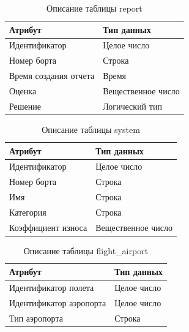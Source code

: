 \begin{table}[H]
    \centering
    \captionsetup{justification=centering}
    \caption{Описание таблицы report}
    \begin{tabular}{|p{}|p{}|}
        \hline
        Атрибут & Тип данных \\
        \hline
        Идентификатор & Целое число \\
        Номер борта & Строка \\
        Время создания отчета & Время \\
        Оценка & Вещественное число \\
        Решение & Логический тип \\
        \hline
    \end{tabular}
    \label{tab:tabl7}
\end{table}

\begin{table}[H]
    \centering
    \captionsetup{justification=centering}
    \caption{Описание таблицы system}
    \begin{tabular}{|p{}|p{}|}
        \hline
        Атрибут & Тип данных \\
        \hline
        Идентификатор & Целое число \\
        Номер борта & Строка \\
        Имя & Строка \\
        Категория & Строка \\
        Коэффициент износа & Вещественное число \\
        \hline
    \end{tabular}
    \label{tab:tabl8}
\end{table}

\begin{table}[H]
    \centering
    \captionsetup{justification=centering}
    \caption{Описание таблицы flight\_airport}
    \begin{tabular}{|p{}|p{}|}
        \hline
        Атрибут & Тип данных \\
        \hline
        Идентификатор полета & Целое число \\
        Идентификатор аэропорта & Целое число \\
        Тип аэропорта & Строка \\
        \hline
    \end{tabular}
    \label{tab:tabl9}
\end{table}

